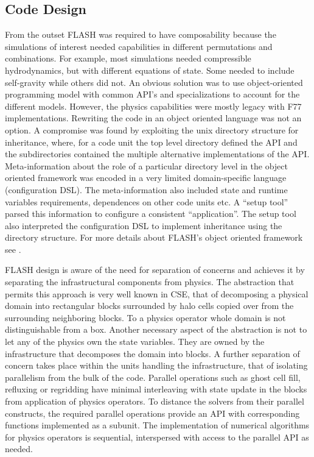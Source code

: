 \subsection{Code Design}
\label{sec:FLASHdesign}
From the outset FLASH was required to have composability because the
simulations of interest needed capabilities in different permutations
and combinations. For example, most simulations needed compressible
hydrodynamics, but with different equations of state. Some needed to
include self-gravity while others did not. An 
obvious solution was to use object-oriented programming model with
common API's and specializations to account for the different
models. However, the physics capabilities were mostly legacy with F77
implementations. Rewriting the code in an object oriented language was
not an option. A compromise was found by exploiting the unix directory
structure for inheritance, where, for a code unit the top level
directory defined the API and the subdirectories contained the
multiple alternative implementations of the API.  Meta-information
about the role of a particular directory level in the object oriented framework
was encoded in a very limited domain-specific language (configuration
DSL). The meta-information also included state and runtime variables
requirements, dependences on other code units etc. A ``setup tool''
parsed this information to configure a consistent ``application''. The
setup tool also interpreted the configuration DSL to implement 
inheritance using the directory structure. For more details about
FLASH's object oriented framework see \cite{Dubey2009, Fryxell2000}.   

FLASH design is aware of the need for separation of concerns and
achieves it by separating the infrastructural components
from physics. The abstraction that permits this approach is very
well known in CSE, that of decomposing a physical domain into
rectangular blocks surrounded by halo cells copied over from the
surrounding neighboring blocks. To a physics operator whole domain is
not distinguishable from a box. Another necessary aspect of the abstraction 
is not to let any of the  physics own the state
variables. They are owned by the infrastructure that 
decomposes the domain into blocks. A further separation of concern
takes place within the units handling the infrastructure, that of
isolating parallelism from the bulk of the code. Parallel
operations such as ghost cell fill, refluxing or regridding have
minimal interleaving with state update in the blocks from application
of physics operators. To distance the solvers from their parallel
constructs, the required parallel operations provide an API with
corresponding functions implemented as a subunit. The implementation
of numerical algorithms for physics operators is sequential,
interspersed with access to the parallel API as needed. 

